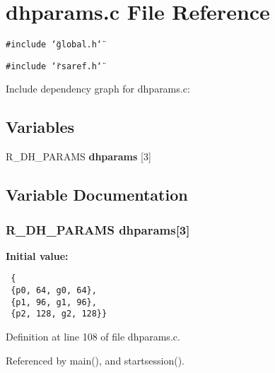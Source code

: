 \section{dhparams.c File Reference}
\label{dhparams_8c}


{\tt \#include \char`\"{}global.h\char`\"{}}\par
{\tt \#include \char`\"{}rsaref.h\char`\"{}}\par


Include dependency graph for dhparams.c:\subsection*{Variables}
\begin{CompactItemize}
\item 
R\_\-DH\_\-PARAMS {\bf dhparams} [3]
\end{CompactItemize}


\subsection{Variable Documentation}
\subsubsection{\setlength{\rightskip}{0pt plus 5cm}R\_\-DH\_\-PARAMS {\bf dhparams}[3]}\label{dhparams_8c_a6}


{\bf Initial value:}

\footnotesize\begin{verbatim} {
 {p0, 64, g0, 64},
 {p1, 96, g1, 96},
 {p2, 128, g2, 128}}
\end{verbatim}\normalsize 


Definition at line 108 of file dhparams.c.

Referenced by main(), and startsession().
